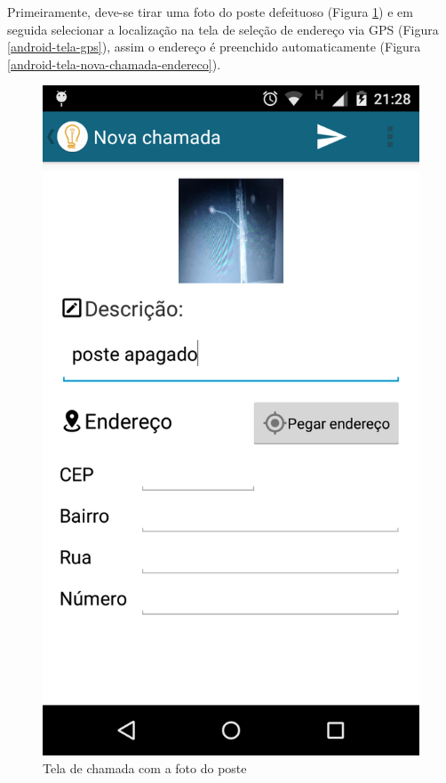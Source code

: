 \documentclass[
	article,			%
	11pt,				%
	oneside,			%
	a4paper,			%
	english,			%
	brazil,				%
	sumario=tradicional
	]{abntex2}
\begin{document}
Primeiramente, deve-se tirar uma foto do poste defeituoso (Figura \ref{android-tela-nova-chamada-foto-poste}) e em seguida selecionar a localização na tela de seleção de endereço via GPS (Figura \ref{android-tela-gps}), assim o endereço é preenchido automaticamente (Figura \ref{android-tela-nova-chamada-endereco}).

\begin{figure}[!htbp]
 \centering
  \begin{minipage}{0.4\textwidth}
    \centering
    \caption{\label{android-tela-nova-chamada-foto-poste}Tela de chamada com a foto do poste}
    \includegraphics[scale=0.1]{android/3.png}

\end{minipage}
\end{figure}
\end{document}
